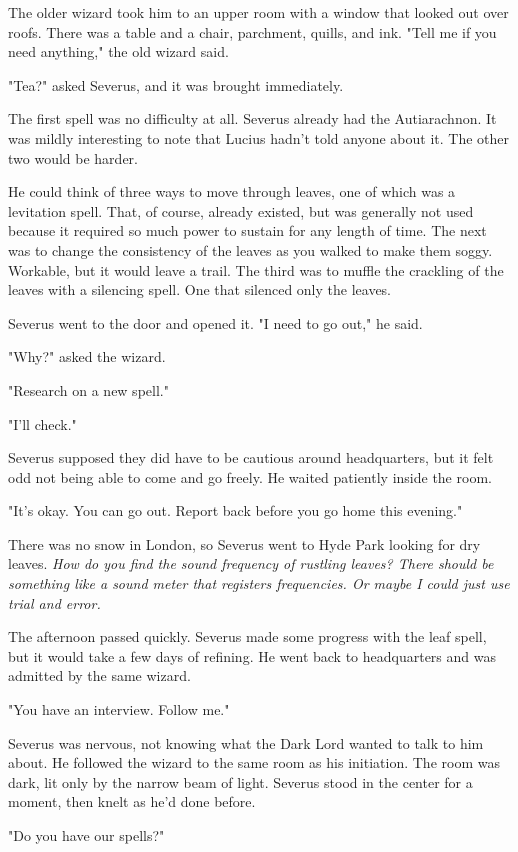The older wizard took him to an upper room with a window that looked out over roofs. There was a table and a chair, parchment, quills, and ink. "Tell me if you need anything," the old wizard said.

"Tea?" asked Severus, and it was brought immediately.

The first spell was no difficulty at all. Severus already had the Autiarachnon. It was mildly interesting to note that Lucius hadn't told anyone about it. The other two would be harder.

He could think of three ways to move through leaves, one of which was a levitation spell. That, of course, already existed, but was generally not used because it required so much power to sustain for any length of time. The next was to change the consistency of the leaves as you walked to make them soggy. Workable, but it would leave a trail. The third was to muffle the crackling of the leaves with a silencing spell. One that silenced only the leaves.

Severus went to the door and opened it. "I need to go out," he said.

"Why?" asked the wizard.

"Research on a new spell."

"I'll check."

Severus supposed they did have to be cautious around headquarters, but it felt odd not being able to come and go freely. He waited patiently inside the room.

"It's okay. You can go out. Report back before you go home this evening."

There was no snow in London, so Severus went to Hyde Park looking for dry leaves. \emph{How do you find the sound frequency of rustling leaves? There should be something like a sound meter that registers frequencies. Or maybe I could just use trial and error.}

The afternoon passed quickly. Severus made some progress with the leaf spell, but it would take a few days of refining. He went back to headquarters and was admitted by the same wizard.

"You have an interview. Follow me."

Severus was nervous, not knowing what the Dark Lord wanted to talk to him about. He followed the wizard to the same room as his initiation. The room was dark, lit only by the narrow beam of light. Severus stood in the center for a moment, then knelt as he'd done before.

"Do you have our spells?"

